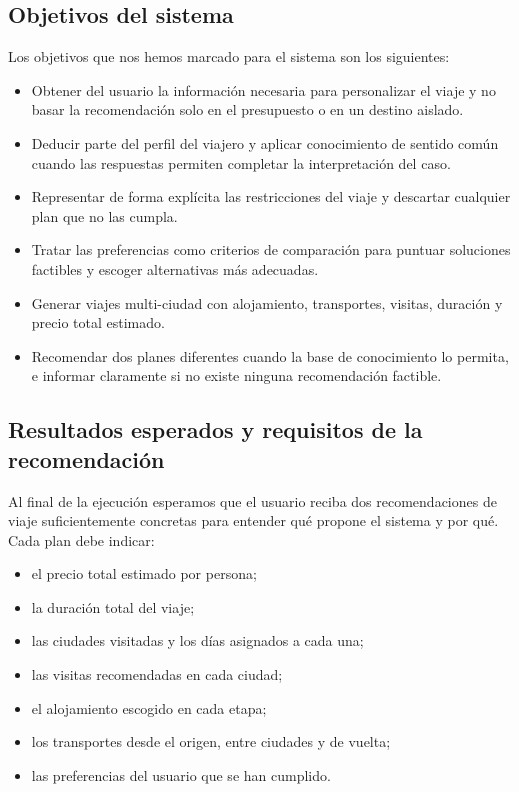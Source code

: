 \documentclass[11pt,a4paper]{article}
\begin{document}
\subsection{Objetivos del sistema}
Los objetivos que nos hemos marcado para el sistema son los siguientes:
\begin{itemize}
    \item Obtener del usuario la informaci\'on necesaria para personalizar el
    viaje y no basar la recomendaci\'on solo en el presupuesto o en un destino
    aislado.
    \item Deducir parte del perfil del viajero y aplicar conocimiento de sentido
    com\'un cuando las respuestas permiten completar la interpretaci\'on del caso.
    \item Representar de forma expl\'icita las restricciones del viaje y
    descartar cualquier plan que no las cumpla.
    \item Tratar las preferencias como criterios de comparaci\'on para puntuar
    soluciones factibles y escoger alternativas m\'as adecuadas.
    \item Generar viajes multi-ciudad con alojamiento, transportes, visitas,
    duraci\'on y precio total estimado.
    \item Recomendar dos planes diferentes cuando la base de conocimiento lo
    permita, e informar claramente si no existe ninguna recomendaci\'on factible.
\end{itemize}

\subsection{Resultados esperados y requisitos de la recomendaci\'on}
Al final de la ejecuci\'on esperamos que el usuario reciba dos recomendaciones
de viaje suficientemente concretas para entender qu\'e propone el sistema y por
qu\'e. Cada plan debe indicar:
\begin{itemize}
    \item el precio total estimado por persona;
    \item la duraci\'on total del viaje;
    \item las ciudades visitadas y los d\'ias asignados a cada una;
    \item las visitas recomendadas en cada ciudad;
    \item el alojamiento escogido en cada etapa;
    \item los transportes desde el origen, entre ciudades y de vuelta;
    \item las preferencias del usuario que se han cumplido.
\end{itemize}
\end{document}
